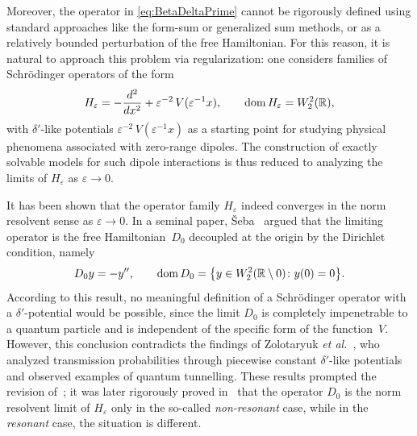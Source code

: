 \documentclass[reqno]{amsart}
\theoremstyle{definition}
\theoremstyle{remark}
\numberwithin{equation}{section}
\newcommand{\dmn}{\mathop{\rm dom}}
\newcommand{\Real}{\mathbb R}
\newcommand{\eps}{\varepsilon}
\begin{document}
Moreover, the operator in \eqref{eq:BetaDeltaPrime} cannot be rigorously defined using standard approaches like the form-sum or generalized sum methods, or as a relatively bounded perturbation of the free Hamiltonian. For this reason, it is natural to approach this problem via regularization: one considers  families of Schr\"odinger operators of the form
\begin{equation*}
	H_\eps= -\frac{d^2}{dx^2}+\eps^{-2}\,V(\eps^{-1}x), \qquad \dmn H_\eps=W^2_2(\Real),
\end{equation*}
with $\delta'$-like potentials $\eps^{-2}\,V(\eps^{-1}x)$ as a starting point for studying physical phenomena associated with zero-range dipoles. The construction of exactly solvable models for such dipole interactions is thus reduced to analyzing the limits of $H_\eps$ as $\eps\to0$.



It has been shown that the operator family $H_\eps$ indeed converges in the norm resolvent sense as $\eps \to 0$. In a seminal paper, \v{S}eba~\cite{SebRMP} argued that the limiting operator is the free Hamiltonian~$D_0$ decoupled at the origin by the Dirichlet condition, namely
\begin{equation}\label{OprD0}
  D_0 y = - y'',\qquad \dmn D_0 = \big\{y\in W^2_2(\Real\setminus{0}) \colon y(0)= 0\big\}.
\end{equation}
According to this result, no meaningful definition of a Schr\"odinger operator with a $\delta'$-potential would be possible, since the limit $D_0$ is completely impenetrable to a quantum particle and is independent of the specific form of the function~$V$. However, this conclusion contradicts the findings of Zolotaryuk \textit{et al.}~\cite{ChristianZolotarIermak03, Zolotaryuk08, Zolotaryuk09, Zolotaryuk10}, who analyzed transmission probabilities through piecewise constant $\delta'$-like potentials and observed examples of quantum tunnelling. These results prompted the revision of~\cite{SebRMP}; it was later rigorously proved in~\cite{GolovatyHrynivJPA2010} that the operator $D_0$ is the norm resolvent limit of $H_\eps$ only in the so-called \textit{non-resonant} case, while in the \textit{resonant} case, the situation is different.
\end{document}
